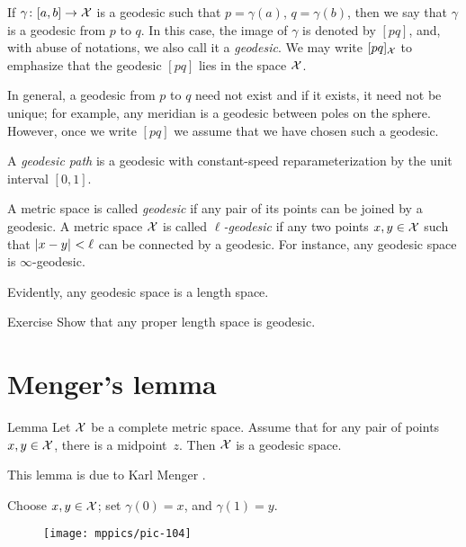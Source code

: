 If $\gamma\colon[a,b]\to \mathcal{X}$ is a geodesic such that $p=\gamma(a)$, $q=\gamma(b)$, then we say that $\gamma$ is a geodesic from $p$ to $q$.
In this case, the image of $\gamma$ is denoted by $[p q]$, and, with abuse of notations, we also call it a \emph{geodesic}.
We may write $[p q]_{\mathcal{X}}$ 
to emphasize that the geodesic $[p q]$ lies in the space ${\mathcal{X}}$.

In general, a geodesic from $p$ to $q$ need not exist and if it exists, it need not  be unique;
for example, any meridian is a geodesic between poles on the sphere.
However, once we write $[p q]$ we assume that we have chosen such a geodesic.

A \emph{geodesic path} is a geodesic with constant-speed reparameterization by the unit interval $[0,1]$.

A metric space is called \emph{geodesic} if any pair of its points can be joined by a geodesic.
A metric space $\mathcal{X}$ is called \emph{$\ell$-geodesic}
if any two points $x,y\in\mathcal{X}$ such that $|{x}-{y}|_{}^{{}}<\ell$ can be connected by a geodesic.
For instance, any geodesic space is $\infty$-geodesic.

Evidently, any geodesic space is a length space.

\begin{thm}{Exercise}\label{ex:compact-length}
Show that any proper length space is geodesic.
\end{thm}

\section{Menger's lemma}

\begin{thm}{Lemma}\label{lem:mid>geod}
Let $\mathcal{X}$ be a complete metric space.
Assume that for any pair of points $x,y\in \mathcal{X}$, 
there is a midpoint~$z$.
Then $\mathcal{X}$ is a geodesic space.

\end{thm}

This lemma is due to Karl Menger \cite[Section 6]{menger}.


Choose $x,y\in \mathcal{X}$;
set $\gamma(0)=x$, and $\gamma(1)=y$.

\begin{figure}[ht!]
\vskip-0mm
\centering
\texttt{[image: mppics/pic-104]}
\end{figure}

